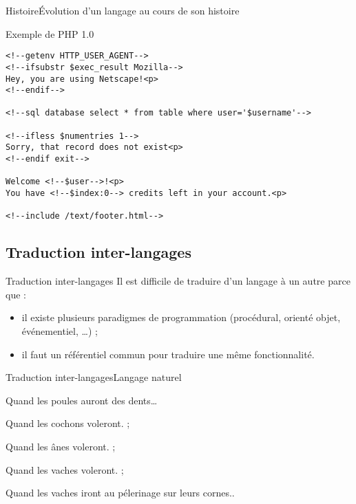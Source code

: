 \documentclass[notes]{beamer}
\newcommand{\ofgfr}[1]{\og{}#1\fg{}}
\begin{document}
\begin{frame}[fragile]{Histoire}{Évolution d'un langage au cours de son histoire}
\begin{exampleblock}{Exemple de PHP 1.0}
\lstset{language=HTML, basicstyle=\tiny}
\begin{lstlisting}
<!--getenv HTTP_USER_AGENT-->
<!--ifsubstr $exec_result Mozilla-->
Hey, you are using Netscape!<p>
<!--endif-->

<!--sql database select * from table where user='$username'-->

<!--ifless $numentries 1-->
Sorry, that record does not exist<p>
<!--endif exit-->

Welcome <!--$user-->!<p>
You have <!--$index:0--> credits left in your account.<p>

<!--include /text/footer.html-->
\end{lstlisting}
\end{exampleblock}
\end{frame}

\subsection{Traduction inter-langages}

\begin{frame}{Traduction inter-langages}
\pause
Il est difficile de traduire d'un langage à un autre parce que :
\pause
\begin{itemize}[<+->]
\item il existe plusieurs paradigmes de programmation (procédural, orienté objet, événementiel, …) ;
\item il faut un référentiel commun pour traduire une même fonctionnalité.
\end{itemize}
\end{frame}

\begin{frame}{Traduction inter-langages}{Langage naturel}
\begin{exampleblock}{\ofgfr{Quand les poules auront des dents…}}
\pause
\begin{description}[<+->]
\item [en] \ofgfr{Quand les cochons voleront.} ;
\item [it] \ofgfr{Quand les ânes voleront.} ;
\item [ca] \ofgfr{Quand les vaches voleront.} ;
\item [ar] \ofgfr{Quand les vaches iront au pélerinage sur leurs cornes.}.
\end{description}
\end{exampleblock}
\end{frame}
\end{document}
